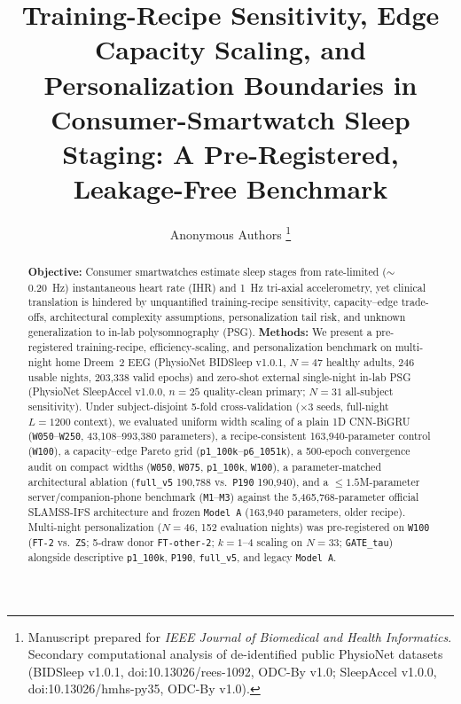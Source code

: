 \documentclass[journal]{IEEEtran}
\providecommand{\thanks}[1]{\footnote{#1}}
\begin{document}
\title{Training-Recipe Sensitivity, Edge Capacity Scaling, and Personalization Boundaries in Consumer-Smartwatch Sleep Staging: A Pre-Registered, Leakage-Free Benchmark}

\author{Anonymous Authors%
\thanks{Manuscript prepared for \textit{IEEE Journal of Biomedical and Health Informatics}. Secondary computational analysis of de-identified public PhysioNet datasets (BIDSleep v1.0.1, doi:10.13026/rees-1092, ODC-By v1.0; SleepAccel v1.0.0, doi:10.13026/hmhs-py35, ODC-By v1.0).}}

\maketitle

\begin{abstract}
\textbf{Objective:} Consumer smartwatches estimate sleep stages from rate-limited ($\sim$0.20~Hz) instantaneous heart rate (IHR) and 1~Hz tri-axial accelerometry, yet clinical translation is hindered by unquantified training-recipe sensitivity, capacity--edge trade-offs, architectural complexity assumptions, personalization tail risk, and unknown generalization to in-lab polysomnography (PSG).
\textbf{Methods:} We present a pre-registered training-recipe, efficiency-scaling, and personalization benchmark on multi-night home Dreem~2 EEG (PhysioNet BIDSleep v1.0.1, $N=47$ healthy adults, 246 usable nights, 203,338 valid epochs) and zero-shot external single-night in-lab PSG (PhysioNet SleepAccel v1.0.0, $n=25$ quality-clean primary; $N=31$ all-subject sensitivity). Under subject-disjoint 5-fold cross-validation ($\times 3$ seeds, full-night $L=1200$ context), we evaluated uniform width scaling of a plain 1D CNN-BiGRU (\texttt{W050}--\texttt{W250}, 43,108--993,380 parameters), a recipe-consistent 163,940-parameter control (\texttt{W100}), a capacity--edge Pareto grid (\texttt{p1\_100k}--\texttt{p6\_1051k}), a 500-epoch convergence audit on compact widths (\texttt{W050}, \texttt{W075}, \texttt{p1\_100k}, \texttt{W100}), a parameter-matched architectural ablation (\texttt{full\_v5} 190,788 vs.\ \texttt{P190} 190,940), and a $\le 1.5$M-parameter server/companion-phone benchmark (\texttt{M1}--\texttt{M3}) against the 5,465,768-parameter official SLAMSS-IFS architecture and frozen \texttt{Model~A} (163,940 parameters, older recipe). Multi-night personalization ($N=46$, 152 evaluation nights) was pre-registered on \texttt{W100} (\texttt{FT-2} vs.\ \texttt{ZS}; 5-draw donor \texttt{FT-other-2}; $k=1$--4 scaling on $N=33$; \texttt{GATE\_tau}) alongside descriptive \texttt{p1\_100k}, \texttt{P190}, \texttt{full\_v5}, and legacy \texttt{Model~A}.

\end{abstract}
\end{document}
